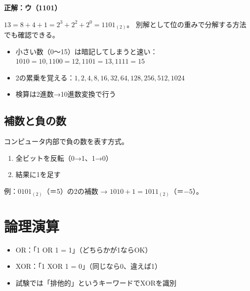 \begin{kaitou}
\textbf{正解：ウ（1101）}

$13 = 8 + 4 + 1 = 2^3 + 2^2 + 2^0 = 1101_{(2)}$。
別解として位の重みで分解する方法でも確認できる。
\end{kaitou}

\begin{minuki}[見抜き方]
\begin{itemize}
  \item 小さい数（0〜15）は暗記してしまうと速い：$1010=10, 1100=12, 1101=13, 1111=15$
  \item 2の累乗を覚える：$1, 2, 4, 8, 16, 32, 64, 128, 256, 512, 1024$
  \item 検算は2進数→10進数変換で行う
\end{itemize}
\end{minuki}

\subsection{補数と負の数}

\begin{teigi}[2の補数]
コンピュータ内部で負の数を表す方式。
\begin{enumerate}
  \item 全ビットを反転（0→1、1→0）
  \item 結果に1を足す
\end{enumerate}
例：$0101_{(2)}$（＝5）の2の補数 → $1010 + 1 = 1011_{(2)}$（＝$-5$）。
\end{teigi}

\section{論理演算}

\begin{hikaku}[4つの基本論理演算]
\end{hikaku}

\begin{pitfall}[ORとXORの混同]
\begin{itemize}
  \item OR：「1 OR 1 = 1」（どちらかが1ならOK）
  \item XOR：「1 XOR 1 = 0」（同じなら0、違えば1）
  \item 試験では「排他的」というキーワードでXORを識別
\end{itemize}
\end{pitfall}

